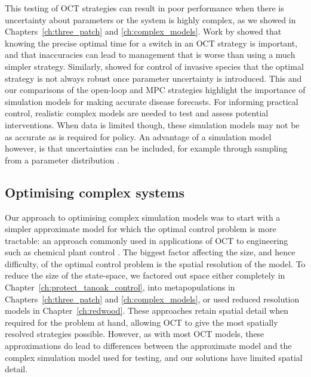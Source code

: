 This testing of OCT strategies can result in poor performance when there is uncertainty about parameters or the system is highly complex, as we showed in Chapters~\ref{ch:three_patch} and \ref{ch:complex_models}. Work by \citet{forster_optimizing_2007} showed that knowing the precise optimal time for a switch in an OCT strategy is important, and that inaccuracies can lead to management that is worse than using a much simpler strategy. Similarly, \citet{carrasco_optimal_2009} showed for control of invasive species that the optimal strategy is not always robust once parameter uncertainty is introduced. This and our comparisons of the open-loop and MPC strategies highlight the importance of simulation models for making accurate disease forecasts. For informing practical control, realistic complex models are needed to test and assess potential interventions. When data is limited though, these simulation models may not be as accurate as is required for policy. An advantage of a simulation model however, is that uncertainties can be included, for example through sampling from a parameter distribution \citep[e.g.][]{cook_constructing_2008,parry_bayesian_2014,cunniffe_optimising_2015}.

\subsection{Optimising complex systems}

Our approach to optimising complex simulation models was to start with a simpler approximate model for which the optimal control problem is more tractable: an approach commonly used in applications of OCT to engineering such as chemical plant control \citep{lee_model_2011}. The biggest factor affecting the size, and hence difficulty, of the optimal control problem is the spatial resolution of the model. To reduce the size of the state-space, we factored out space either completely in Chapter~\ref{ch:protect_tanoak_control}, into metapopulations in Chapters~\ref{ch:three_patch} and \ref{ch:complex_models}, or used reduced resolution models in Chapter~\ref{ch:redwood}. These approaches retain spatial detail when required for the problem at hand, allowing OCT to give the most spatially resolved strategies possible. However, as with most OCT models, these approximations do lead to differences between the approximate model and the complex simulation model used for testing, and our solutions have limited spatial detail.

